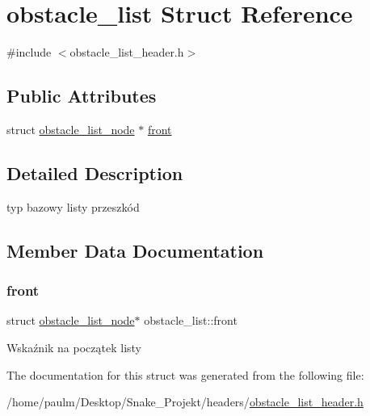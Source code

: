 \hypertarget{structobstacle__list}{}\section{obstacle\+\_\+list Struct Reference}
\label{structobstacle__list}


{\ttfamily \#include $<$obstacle\+\_\+list\+\_\+header.\+h$>$}

\subsection*{Public Attributes}
\begin{DoxyCompactItemize}
\item 
struct \mbox{\hyperlink{structobstacle__list__node}{obstacle\+\_\+list\+\_\+node}} $\ast$ \mbox{\hyperlink{structobstacle__list_a79746ef9a043222e76945b49782f8fee}{front}}
\end{DoxyCompactItemize}


\subsection{Detailed Description}
typ bazowy listy przeszkód 

\subsection{Member Data Documentation}
\mbox{\label{structobstacle__list_a79746ef9a043222e76945b49782f8fee}} 
\subsubsection{\texorpdfstring{front}{front}}
{\footnotesize\ttfamily struct \mbox{\hyperlink{structobstacle__list__node}{obstacle\+\_\+list\+\_\+node}}$\ast$ obstacle\+\_\+list\+::front}

Wskaźnik na początek listy 

The documentation for this struct was generated from the following file\+:\begin{DoxyCompactItemize}
\item 
/home/paulm/\+Desktop/\+Snake\+\_\+\+Projekt/headers/\mbox{\hyperlink{obstacle__list__header_8h}{obstacle\+\_\+list\+\_\+header.\+h}}\end{DoxyCompactItemize}
